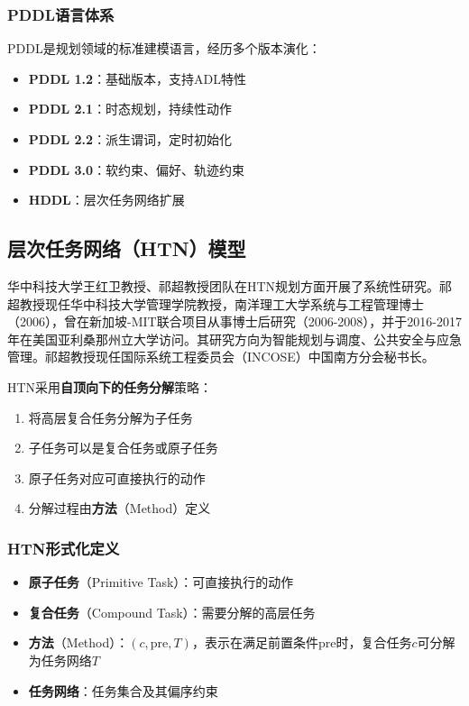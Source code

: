 \documentclass[12pt,a4paper]{ctexart}
\begin{document}
\subsubsection{PDDL语言体系}

PDDL是规划领域的标准建模语言，经历多个版本演化：
\begin{itemize}[leftmargin=2em]
    \item \textbf{PDDL 1.2}：基础版本，支持ADL特性
    \item \textbf{PDDL 2.1}：时态规划，持续性动作
    \item \textbf{PDDL 2.2}：派生谓词，定时初始化
    \item \textbf{PDDL 3.0}：软约束、偏好、轨迹约束
    \item \textbf{HDDL}：层次任务网络扩展
\end{itemize}

\subsection{层次任务网络（HTN）模型}

华中科技大学王红卫教授、祁超教授团队在HTN规划方面开展了系统性研究。祁超教授现任华中科技大学管理学院教授，南洋理工大学系统与工程管理博士（2006），曾在新加坡-MIT联合项目从事博士后研究（2006-2008），并于2016-2017年在美国亚利桑那州立大学访问。其研究方向为智能规划与调度、公共安全与应急管理。祁超教授现任国际系统工程委员会（INCOSE）中国南方分会秘书长。

\begin{keypoint}[HTN规划的核心思想]
HTN采用\textbf{自顶向下的任务分解}策略：
\begin{enumerate}
    \item 将高层复合任务分解为子任务
    \item 子任务可以是复合任务或原子任务
    \item 原子任务对应可直接执行的动作
    \item 分解过程由\textbf{方法}（Method）定义
\end{enumerate}
\end{keypoint}

\subsubsection{HTN形式化定义}

\begin{itemize}[leftmargin=2em]
    \item \textbf{原子任务}（Primitive Task）：可直接执行的动作
    \item \textbf{复合任务}（Compound Task）：需要分解的高层任务
    \item \textbf{方法}（Method）：$(c, \text{pre}, T)$，表示在满足前置条件$\text{pre}$时，复合任务$c$可分解为任务网络$T$
    \item \textbf{任务网络}：任务集合及其偏序约束
\end{itemize}
\end{document}
